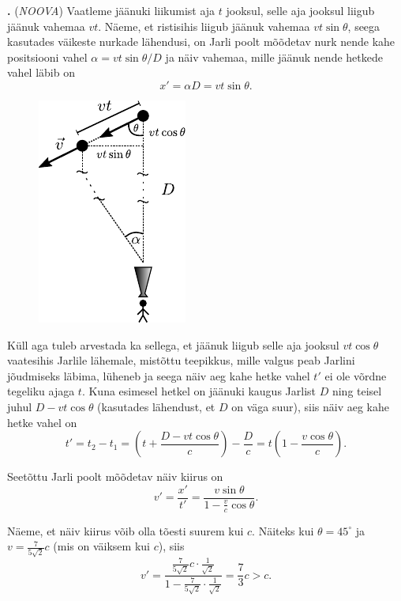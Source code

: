 \documentclass[12pt,a5paper]{article}
\newcommand{\numb}[1]{\vspace{5pt}\textbf{\large #1}}
\newcommand{\nimi}[1]{(\textsl{\small #1})}
\newcounter{ylesanne}
\newcommand{\yl}[1]{\addtocounter{ylesanne}{1}\numb{\theylesanne.} \nimi{#1} \newblock{}}
\begin{document}
\yl{NOOVA}
Vaatleme jäänuki liikumist aja $t$ jooksul, selle aja jooksul liigub jäänuk vahemaa $vt$. Näeme, et ristisihis liigub jäänuk vahemaa $vt \sin \theta$, seega kasutades väikeste nurkade lähendusi, on Jarli poolt mõõdetav nurk nende kahe positsiooni vahel $\alpha = vt\sin\theta/D$ ja näiv vahemaa, mille jäänuk nende hetkede vahel läbib on
\begin{equation*}
	x' = \alpha D = vt\sin\theta.
\end{equation*}

\begin{figure}[h]
\centering
\includegraphics[width=0.25\linewidth]{noova_lah_joon}
\end{figure}

Küll aga tuleb arvestada ka sellega, et jäänuk liigub selle aja jooksul $vt \cos\theta$ vaatesihis Jarlile lähemale, mistõttu teepikkus, mille valgus peab Jarlini jõudmiseks läbima, lüheneb ja seega näiv aeg kahe hetke vahel $t'$ ei ole võrdne tegeliku ajaga $t$. Kuna esimesel hetkel on jäänuki kaugus Jarlist $D$ ning teisel juhul $D-vt\cos\theta$ (kasutades lähendust, et $D$ on väga suur), siis näiv aeg kahe hetke vahel on
\begin{equation*}
t' = t_2 - t_1 = \left(t + \frac{D-vt\cos\theta}{c}\right) - \frac{D}{c} = t\left(1 - \frac{v\cos\theta}{c}\right).
\end{equation*}

Seetõttu Jarli poolt mõõdetav näiv kiirus on
\begin{equation*}
v' = \frac{x'}{t'} = \frac{v \sin \theta}{1- \frac{v}{c}\cos\theta}.
\end{equation*}

Näeme, et näiv kiirus võib olla tõesti suurem kui $c$. Näiteks kui $\theta = 45^\circ$ ja $v = \frac{7}{5\sqrt 2}c$ (mis on väiksem kui $c$), siis
\begin{equation*}
v' = \frac{\frac{7}{5\sqrt 2} c \cdot \frac{1}{\sqrt 2}}{1- \frac{7}{5\sqrt 2} \cdot \frac{1}{\sqrt 2}} = \frac{7}{3} c > c.
\end{equation*}
\end{document}
